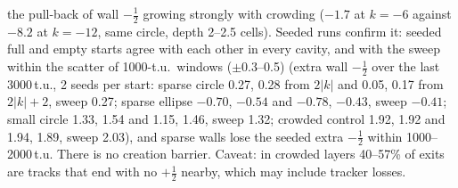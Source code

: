 \documentclass[11pt,a4paper]{article}
\newcommand{\half}{\tfrac12}
\begin{document}
the pull-back of wall $-\half$ growing strongly with crowding ($-1.7$ at $k=-6$ against $-8.2$ at $k=-12$, same circle, depth 2--2.5 cells). Seeded runs confirm it: seeded full and empty starts agree with each other in every cavity, and with the sweep within the scatter of 1000-t.u.\ windows ($\pm0.3$--0.5) (extra wall $-\half$ over the last 3000\,t.u., 2 seeds per start: sparse circle 0.27, 0.28 from
$2|k|$ and 0.05, 0.17 from $2|k|+2$, sweep 0.27; sparse ellipse $-0.70$, $-0.54$ and $-0.78$, $-0.43$, sweep $-0.41$; small circle 1.33, 1.54 and 1.15, 1.46, sweep 1.32; crowded control
1.92, 1.92 and 1.94, 1.89, sweep 2.03), and sparse walls lose the seeded extra $-\half$ within 1000--2000\,t.u. There is no creation barrier. Caveat: in crowded layers 40--57\% of exits are tracks that end with no $+\half$ nearby, which may include tracker losses.

\end{document}

